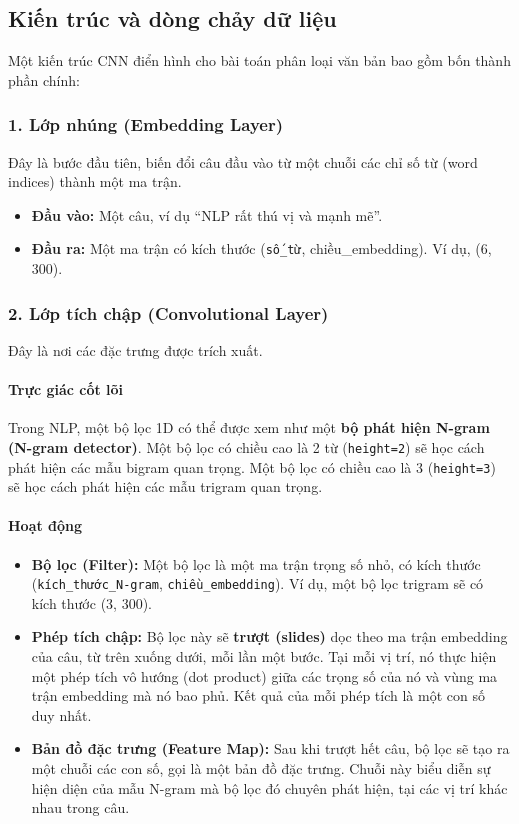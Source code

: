 \subsection{Kiến trúc và dòng chảy dữ liệu}
\label{ssec:cnn_architecture}
Một kiến trúc CNN điển hình cho bài toán phân loại văn bản bao gồm bốn thành phần chính:

\subsubsection{1. Lớp nhúng (Embedding Layer)}
Đây là bước đầu tiên, biến đổi câu đầu vào từ một chuỗi các chỉ số từ (word indices) thành một ma trận.
\begin{itemize}
    \item \textbf{Đầu vào:} Một câu, ví dụ “NLP rất thú vị và mạnh mẽ”.
    \item \textbf{Đầu ra:} Một ma trận có kích thước (\texttt{số\_từ}, chiều\_embedding). Ví dụ, (6, 300).
\end{itemize}

\subsubsection{2. Lớp tích chập (Convolutional Layer)}
Đây là nơi các đặc trưng được trích xuất.
\paragraph{Trực giác cốt lõi}
Trong NLP, một bộ lọc 1D có thể được xem như một \textbf{bộ phát hiện N-gram (N-gram detector)}. Một bộ lọc có chiều cao là 2 từ (\texttt{height=2}) sẽ học cách phát hiện các mẫu bigram quan trọng. Một bộ lọc có chiều cao là 3 (\texttt{height=3}) sẽ học cách phát hiện các mẫu trigram quan trọng.

\paragraph{Hoạt động}
\begin{itemize}
    \item \textbf{Bộ lọc (Filter):} Một bộ lọc là một ma trận trọng số nhỏ, có kích thước (\texttt{kích\_thước\_N-gram}, \texttt{chiều\_embedding}). Ví dụ, một bộ lọc trigram sẽ có kích thước (3, 300).
    \item \textbf{Phép tích chập:} Bộ lọc này sẽ \textbf{trượt (slides)} dọc theo ma trận embedding của câu, từ trên xuống dưới, mỗi lần một bước. Tại mỗi vị trí, nó thực hiện một phép tích vô hướng (dot product) giữa các trọng số của nó và vùng ma trận embedding mà nó bao phủ. Kết quả của mỗi phép tích là một con số duy nhất.
    \item \textbf{Bản đồ đặc trưng (Feature Map):} Sau khi trượt hết câu, bộ lọc sẽ tạo ra một chuỗi các con số, gọi là một bản đồ đặc trưng. Chuỗi này biểu diễn sự hiện diện của mẫu N-gram mà bộ lọc đó chuyên phát hiện, tại các vị trí khác nhau trong câu.
\end{itemize}

